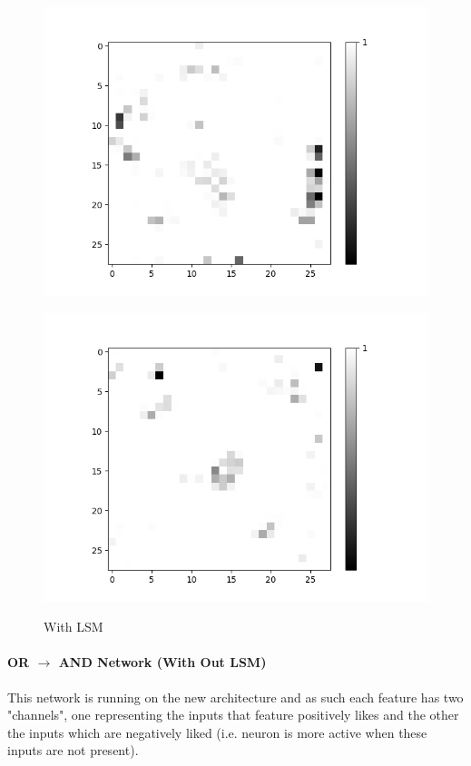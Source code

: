 \begin{figure}[H]
\begin{minipage}[b]{0.19\textwidth}
		\includegraphics[width=\textwidth]{OR-AND(OLD)(W-LSM)(1)/Layer0-Neuron-20.png}
		\label{}
	\end{minipage}
	\begin{minipage}[b]{0.19\textwidth}
		\includegraphics[width=\textwidth]{OR-AND(OLD)(W-LSM)(1)/Layer0-Neuron-29.png}
		\label{}
	\end{minipage}

	\caption{With LSM}
	\hfill
\end{figure}

\paragraph{OR $\rightarrow$ AND Network (With Out LSM)}
This network is running on the new architecture and as such each feature has two "channels", one representing the inputs that feature positively likes and the other the inputs which are negatively liked (i.e. neuron is more active when these inputs are not present).

